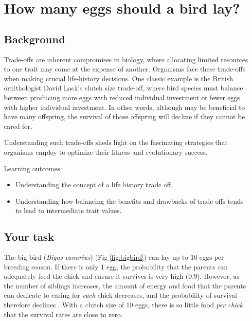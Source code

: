 \documentclass[
  a4paper]{book}
\providecommand{\tightlist}{%
  \setlength{\itemsep}{0pt}\setlength{\parskip}{0pt}}
\begin{document}
\chapter{How many eggs should a bird lay?}\label{how-many-eggs-should-a-bird-lay}

\section{Background}\label{background-9}

Trade-offs are inherent compromises in biology, where allocating limited resources to one trait may come at the expense of another. Organisms face these trade-offs when making crucial life-history decisions. One classic example is the British ornithologist David Lack's clutch size trade-off, where bird species must balance between producing more eggs with reduced individual investment or fewer eggs with higher individual investment. In other words, although may be beneficial to have many offspring, the survival of those offspring will decline if they cannot be cared for.

Understanding such trade-offs sheds light on the fascinating strategies that organisms employ to optimize their fitness and evolutionary success.

\begin{do-something}
Learning outcomes:

\begin{itemize}
\tightlist
\item
  Understanding the concept of a life history trade off.
\item
  Understanding how balancing the benefits and drawbacks of trade offs
  tends to lead to intermediate trait values.
\end{itemize}
\end{do-something}

\section{Your task}\label{your-task-9}

The big bird (\emph{Bigus canarius}) (Fig \ref{fig:bigbird}) can lay up to 10 eggs per breeding season. If there is only 1 egg, the probability that the parents can adequately feed the chick and ensure it survives is very high (0.9). However, as the number of siblings increases, the amount of energy and food that the parents can dedicate to caring for \emph{each} chick decreases, and the probability of survival therefore declines . With a clutch size of 10 eggs, there is so little food \emph{per chick} that the survival rates are close to zero.
\end{document}
